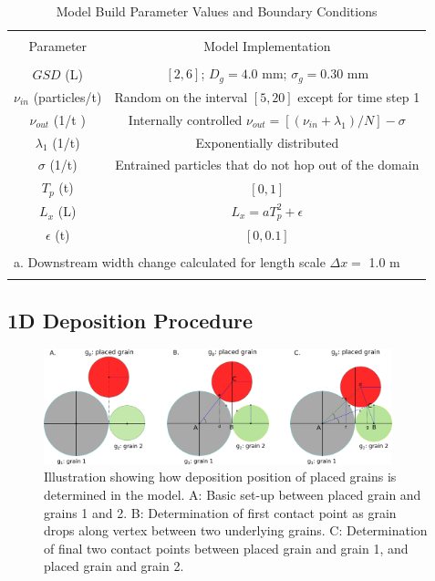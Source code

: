 \documentclass[12pt]{article}
\begin{document}
\begin{table}[h!]
	\caption{Model Build Parameter Values and Boundary Conditions}
	\centering
	\begin{tabular}{c c}
		\multicolumn{2}{c}{} \\[6pt]
		Parameter & Model Implementation \\
		\hline 
		\\[-0.5em]
		$GSD$ (L) & $[2,6]$; $D_g=4.0$ mm; $\sigma_g=0.30$ mm \\[6pt]
		$\nu_{in}$ (particles/t) & Random on the interval $[5,20]$ except for time step 1 \\[6pt]
		$\nu_{out}$ (1/t )& Internally controlled $\nu_{out}=[(\nu_{in}+\lambda_1)/N]-\sigma$ \\[6pt]
		$\lambda_1$ (1/t) & Exponentially distributed \\[6pt]
		$\sigma$ (1/t) & Entrained particles that do not hop out of the domain \\[6pt]
		$T_p$ (t) & $[0,1]$ \\[6pt]
		$L_x$ (L) & $L_x=aT_p^2+\epsilon$ \\[6pt]
		$\epsilon$ (t) & $[0,0.1]$ \\[6pt]
		\hline
		\\[-0.2em]
		\multicolumn{2}{l}{a. Downstream width change calculated for length scale $\varDelta x=$ 1.0 m} \\
		\label{Table1}
	\end{tabular}
\end{table}
\subsection{1D Deposition Procedure}
\begin{figure}[!ht]
	\centering
	\includegraphics[width=0.90\textwidth]{Figures/1D_Deposition.png}
	\caption{Illustration showing how deposition position of placed grains is determined in the model. A: Basic set-up between placed grain and grains 1 and 2. B: Determination of first contact point as grain drops along vertex between two underlying grains. C: Determination of final two contact points between placed grain and grain 1, and placed grain and grain 2.}
	\label{Fig:Depo}
\end{figure}
\end{document}
